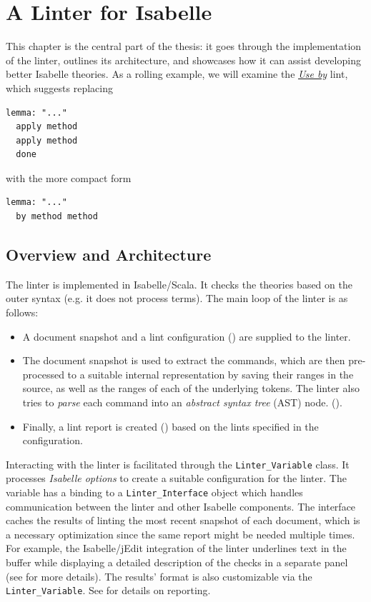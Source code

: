 \chapter{A Linter for Isabelle}\label{chapter:implementation} 

This chapter is the central part of the thesis: it goes through the implementation
of the linter, outlines its architecture, and showcases how it can
assist developing better Isabelle theories.
As a rolling example, we will examine the \hyperref[lint:useby]{\textit{Use by}} lint, which
suggests replacing

\begin{lstlisting}
lemma: "..."
  apply method
  apply method
  done
\end{lstlisting}
with the more compact form
\begin{lstlisting}
lemma: "..."
  by method method
\end{lstlisting}

\section{Overview and Architecture}

The linter is implemented in Isabelle/Scala. It checks the
theories based on the outer syntax (e.g. it does not process terms).
The main loop of the linter is as follows:
\begin{itemize}
    \item A document snapshot and a lint configuration 
    () are supplied to
    the linter.
    \item The document snapshot is used to extract the commands,
    which are then pre-processed to a suitable internal representation
    by saving their ranges in the source, as
    well as the ranges of each of the underlying tokens. The linter also tries to
    \textit{parse} each command into an \textit{abstract syntax tree} (AST) node.
    ().
    \item Finally, a lint report is created () based
    on the lints specified in the configuration.
\end{itemize}
Interacting with the linter is facilitated through the 
\texttt{Linter\_Variable} class. It processes \textit{Isabelle options} to
create a suitable configuration for the linter. The variable has a binding to a
\texttt{Linter\_Interface} object which handles communication
between the linter and other Isabelle components. The interface caches the results
of linting the most recent snapshot of each document, which is a necessary 
optimization since the same report might be needed multiple times. For example, 
the Isabelle/jEdit integration of the linter underlines text in the buffer while 
displaying a detailed description of the checks in a separate panel
(see  for more details).
The results' format is also customizable via the \texttt{Linter\_Variable}. 
See  for details on reporting.

